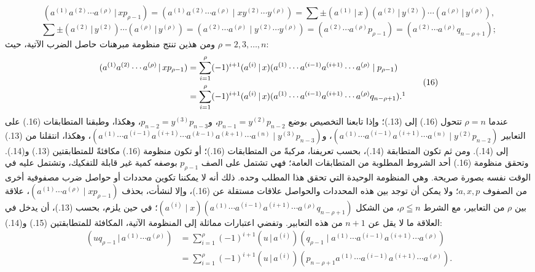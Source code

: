 \documentclass[11pt]{article}
\providecommand{\pair}[2]{(#1\,|\,#2)}
\begin{document}
\[
\pair{a^{(1)}a^{(2)}\cdots a^{(\rho)}}{xp_{\rho-1}}
=(a^{(1)}a^{(2)}\cdots a^{(\rho)}\mid xy^{(2)}\cdots y^{(\rho)})
=\sum\pm\pair{a^{(1)}}{x}\pair{a^{(2)}}{y^{(2)}}\cdots\pair{a^{(\rho)}}{y^{(\rho)}},
\]
\[
\sum\pm\pair{a^{(2)}}{y^{(2)}}\cdots\pair{a^{(\rho)}}{y^{(\rho)}}
=(a^{(2)}\cdots a^{(\rho)}\mid y^{(2)}\cdots y^{(\rho)})
=(a^{(2)}\cdots a^{(\rho)}p_{\rho-1})=(a^{(2)}\cdots a^{(\rho)}q_{n-\rho+1});
\]
ومن هذين تنتج منظومة مبرهنات حاصل الضرب الآتية، حيث $\rho=2,3,\ldots,n$:
\begin{equation}
\begin{aligned}
\pair{a^{(1)}a^{(2)}\cdots a^{(\rho)}}{xp_{\rho-1}}
 &=\sum_{i=1}^{\rho}(-1)^{i+1}\pair{a^{(i)}}{x}(a^{(1)}\cdots a^{(i-1)}a^{(i+1)}\cdots a^{(\rho)}\mid p_{\rho-1})\\
 &=\sum_{i=1}^{\rho}(-1)^{i+1}\pair{a^{(i)}}{x}(a^{(1)}\cdots a^{(i-1)}a^{(i+1)}\cdots a^{(\rho)}q_{n-\rho+1}).\footnotemark
\end{aligned}
\tag{16}
\end{equation}
عندما $\rho=n$ تتحول (16.) إلى (13.)؛ وإذا تابعنا التخصيص بوضع $p_{n-1}=y^{(2)}p_{n-2}$، و$p_{n-2}=y^{(3)}p_{n-3}$، وهكذا، وطبقنا المتطابقات (16.) على التعابير $(a^{(1)}\cdots a^{(i-1)}a^{(i+1)}\cdots a^{(n)}\mid y^{(2)}p_{n-2})$، و$(a^{(1)}\cdots a^{(i-1)}a^{(i+1)}\cdots a^{(k-1)}a^{(k+1)}\cdots a^{(n)}\mid y^{(3)}p_{n-3})$، وهكذا، انتقلنا من (13.) إلى (14.). ومن ثم تكون المتطابقة (14.)، بحسب تعريفنا، مركبةً من المتطابقات (16.)؛ أو تكون منظومة (16.) مكافئةً للمتطابقتين (13.) و(14.). وتحقق منظومة (16.) أحد الشروط المطلوبة من المتطابقات العامة؛ فهي تشتمل على الصف $p_{\rho-1}$ بوصفه كمية غير قابلة للتفكيك، وتشتمل عليه في الوقت نفسه بصورة صريحة. وهي المنظومة الوحيدة التي تحقق هذا المطلب وحده. ذلك أنه لا يمكننا تكوين محددات أو حواصل ضرب مصفوفية أخرى من الصفوف $a,x,p$؛ ولا يمكن أن توجد بين هذه المحددات والحواصل علاقات مستقلة عن (16.)، وإلا لنشأت، بحذف $(a^{(1)}\cdots a^{(\rho)}\mid xp_{\rho-1})$، علاقة بين $\rho$ من التعابير، مع الشرط $\rho\leqq n$، من الشكل $(a^{(i)}\mid x)(a^{(1)}\cdots a^{(i-1)}a^{(i+1)}\cdots a^{(\rho)}q_{n-\rho+1})$؛ في حين يلزم، بحسب (13.)، أن يدخل في العلاقة ما لا يقل عن $n+1$ من هذه التعابير. وتفضي اعتبارات مماثلة إلى المنظومة الآتية، المكافئة للمتطابقتين (15.) و(14.):
\begin{equation}
\begin{aligned}
\pair{u q_{\rho-1}}{a^{(1)}\cdots a^{(\rho)}}
 &=\sum_{i=1}^{\rho}(-1)^{i+1}\pair{u}{a^{(i)}}(q_{\rho-1}\mid a^{(1)}\cdots a^{(i-1)}a^{(i+1)}\cdots a^{(\rho)})\\
 &=\sum_{i=1}^{\rho}(-1)^{i+1}\pair{u}{a^{(i)}}(p_{n-\rho+1}a^{(1)}\cdots a^{(i-1)}a^{(i+1)}\cdots a^{(\rho)}).
\end{aligned}
\tag{17}
\end{equation}
\end{document}
